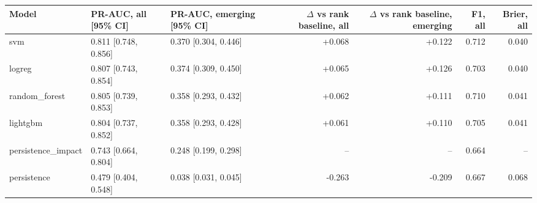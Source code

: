 \begin{tabular}{lllrrrr}
\toprule
Model & PR-AUC, all [95\% CI] & PR-AUC, emerging [95\% CI] & $\Delta$ vs rank baseline, all & $\Delta$ vs rank baseline, emerging & F1, all & Brier, all \\
\midrule
svm & 0.811 [0.748, 0.856] & 0.370 [0.304, 0.446] & +0.068 & +0.122 & 0.712 & 0.040 \\
logreg & 0.807 [0.743, 0.854] & 0.374 [0.309, 0.450] & +0.065 & +0.126 & 0.703 & 0.040 \\
random\_forest & 0.805 [0.739, 0.853] & 0.358 [0.293, 0.432] & +0.062 & +0.111 & 0.710 & 0.041 \\
lightgbm & 0.804 [0.737, 0.852] & 0.358 [0.293, 0.428] & +0.061 & +0.110 & 0.705 & 0.041 \\
persistence\_impact & 0.743 [0.664, 0.804] & 0.248 [0.199, 0.298] & -- & -- & 0.664 & -- \\
persistence & 0.479 [0.404, 0.548] & 0.038 [0.031, 0.045] & -0.263 & -0.209 & 0.667 & 0.068 \\
\bottomrule
\end{tabular}
